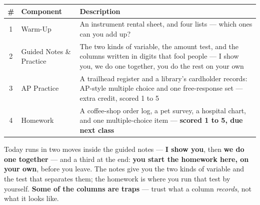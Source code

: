 \documentclass[12pt]{article}
\begin{document}
\boxguard[14]
\begin{tocbox}
\small
\renewcommand{\arraystretch}{1.5}
\begin{tabularx}{\linewidth}{@{} c l X @{}}
\rowcolor{sky}
\textbf{\#} & \textbf{Component} & \textbf{Description} \\
\midrule
1 & Warm-Up & An instrument rental sheet, and four lists --- which ones can you add up? \\
2 & Guided Notes \& Practice & The two kinds of variable, the amount test, and the columns
                 written in digits that fool people --- I show you, we do one together, you do
                 the rest on your own \\
3 & AP Practice & A trailhead register and a library's cardholder records: AP-style multiple
                 choice and one free-response set --- extra credit, scored 1 to 5 \\
4 & Homework & A coffee-shop order log, a pet survey, a hospital chart, and one
                 multiple-choice item --- \textbf{scored 1 to 5, due next class} \\
\end{tabularx}
\end{tocbox}

\vspace{0.14in}

\boxguard[8]
\begin{remindbox}
\small
Today runs in two moves inside the guided notes --- \textbf{I show you}, then \textbf{we do one
together} --- and a third at the end: \textbf{you start the homework here, on your own}, before
you leave. The notes give you the two kinds of variable and the test that separates them; the
homework is where you run that test by yourself. \textbf{Some of the columns are traps} --- trust
what a column \emph{records}, not what it looks like.
\end{remindbox}
\end{document}

